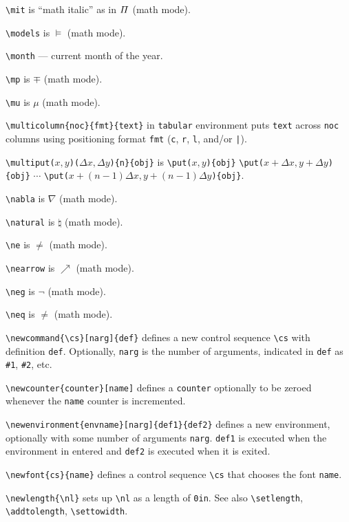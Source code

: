 \verb"\mit" is ``math italic'' as in ${\mit \Pi}$ (math mode).

\verb"\models" is $\models$ (math mode).

\verb"\month" --- current month of the year.

\verb"\mp" is $\mp$ (math mode).

\verb"\mu" is $\mu$ (math mode).

\verb"\multicolumn{noc}{fmt}{text}" in \verb"tabular" environment puts
	\verb"text" across \verb"noc" columns using positioning format
	\verb"fmt" (\verb"c", \verb"r", \verb"l", and/or \verb"|").

\verb"\multiput("$x,y$\verb")("$\Delta x,\Delta y$\verb"){n}{obj}" is
	\ifsmallcrib \relax \else \linebreak \fi
	\verb"\put("$x,y$\verb"){obj}" \newline
	\verb"\put("$x+\Delta x,y+\Delta y$\verb"){obj}" \newline
	$\cdots$\newline
	\verb"\put("$x+(n-1)\Delta x,y+(n-1)\Delta y$\verb"){obj}".

\verb"\nabla" is $\nabla$ (math mode).

\verb"\natural" is $\natural$ (math mode).

\verb"\ne" is $\ne$ (math mode).

\verb"\nearrow" is $\nearrow$ (math mode).

\verb"\neg" is $\neg$ (math mode).

\verb"\neq" is $\neq$ (math mode).

\verb"\newcommand{\cs}[narg]{def}" defines a new control sequence \verb"\cs"
	with definition \verb"def". Optionally, \verb"narg" is the number
	of arguments, indicated in \verb"def" as \verb"#1", \verb"#2",
	etc.

\verb"\newcounter{counter}[name]" defines a \verb"counter" optionally
	to be zeroed whenever the \verb"name" counter is incremented.

\verb"\newenvironment{envname}[narg]{def1}{def2}" defines a new environment,
	optionally with some number of arguments \verb"narg".  \verb"def1"
	is executed when the environment in entered and \verb"def2" is
	executed when it is exited.

\verb"\newfont{cs}{name}" defines a control sequence \verb"\cs" that
	chooses the font \verb"name".

\verb"\newlength{\nl}" sets up \verb"\nl" as a length of \verb"0in". See
	also \verb"\setlength", \verb"\addtolength", \verb"\settowidth".

